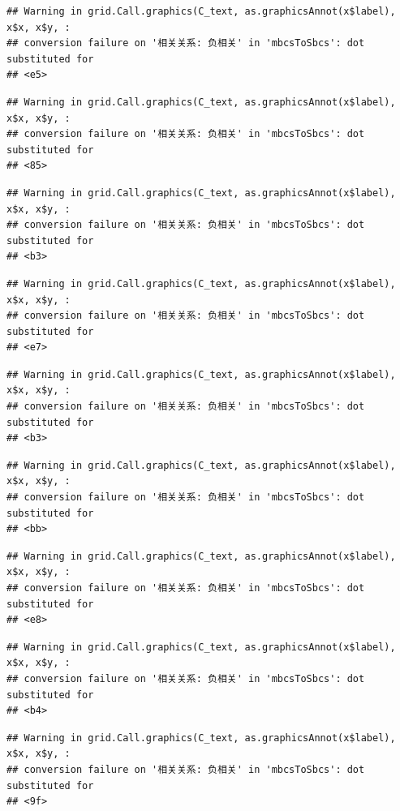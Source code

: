 \documentclass[
]{book}
\begin{document}
\begin{verbatim}
## Warning in grid.Call.graphics(C_text, as.graphicsAnnot(x$label), x$x, x$y, :
## conversion failure on '相关关系: 负相关' in 'mbcsToSbcs': dot substituted for
## <e5>
\end{verbatim}

\begin{verbatim}
## Warning in grid.Call.graphics(C_text, as.graphicsAnnot(x$label), x$x, x$y, :
## conversion failure on '相关关系: 负相关' in 'mbcsToSbcs': dot substituted for
## <85>
\end{verbatim}

\begin{verbatim}
## Warning in grid.Call.graphics(C_text, as.graphicsAnnot(x$label), x$x, x$y, :
## conversion failure on '相关关系: 负相关' in 'mbcsToSbcs': dot substituted for
## <b3>
\end{verbatim}

\begin{verbatim}
## Warning in grid.Call.graphics(C_text, as.graphicsAnnot(x$label), x$x, x$y, :
## conversion failure on '相关关系: 负相关' in 'mbcsToSbcs': dot substituted for
## <e7>
\end{verbatim}

\begin{verbatim}
## Warning in grid.Call.graphics(C_text, as.graphicsAnnot(x$label), x$x, x$y, :
## conversion failure on '相关关系: 负相关' in 'mbcsToSbcs': dot substituted for
## <b3>
\end{verbatim}

\begin{verbatim}
## Warning in grid.Call.graphics(C_text, as.graphicsAnnot(x$label), x$x, x$y, :
## conversion failure on '相关关系: 负相关' in 'mbcsToSbcs': dot substituted for
## <bb>
\end{verbatim}

\begin{verbatim}
## Warning in grid.Call.graphics(C_text, as.graphicsAnnot(x$label), x$x, x$y, :
## conversion failure on '相关关系: 负相关' in 'mbcsToSbcs': dot substituted for
## <e8>
\end{verbatim}

\begin{verbatim}
## Warning in grid.Call.graphics(C_text, as.graphicsAnnot(x$label), x$x, x$y, :
## conversion failure on '相关关系: 负相关' in 'mbcsToSbcs': dot substituted for
## <b4>
\end{verbatim}

\begin{verbatim}
## Warning in grid.Call.graphics(C_text, as.graphicsAnnot(x$label), x$x, x$y, :
## conversion failure on '相关关系: 负相关' in 'mbcsToSbcs': dot substituted for
## <9f>
\end{verbatim}
\end{document}
